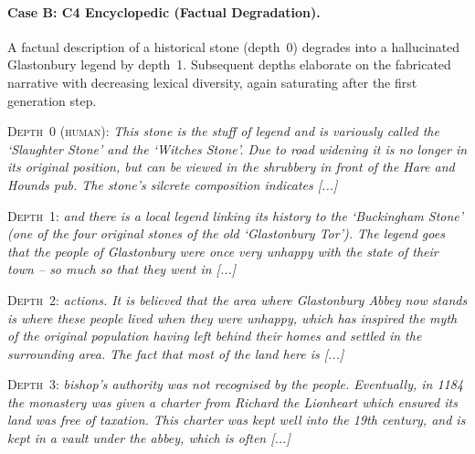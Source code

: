 \medskip

\paragraph{Case B: C4 Encyclopedic (Factual Degradation).}
A factual description of a historical stone (depth~0) degrades into a hallucinated Glastonbury legend by depth~1. Subsequent depths elaborate on the fabricated narrative with decreasing lexical diversity, again saturating after the first generation step.

\begin{center}
{\footnotesize
{}}
\end{center}

\noindent\textsc{Depth~0 (human):} {\small\itshape This stone is the stuff of legend and is variously called the `Slaughter Stone' and the `Witches Stone'. Due to road widening it is no longer in its original position, but can be viewed in the shrubbery in front of the Hare and Hounds pub. The stone's silcrete composition indicates [...]}
\smallskip

\noindent\textsc{Depth~1:} {\small\itshape and there is a local legend linking its history to the `Buckingham Stone' (one of the four original stones of the old `Glastonbury Tor'). The legend goes that the people of Glastonbury were once very unhappy with the state of their town -- so much so that they went in [...]}
\smallskip

\noindent\textsc{Depth~2:} {\small\itshape actions. It is believed that the area where Glastonbury Abbey now stands is where these people lived when they were unhappy, which has inspired the myth of the original population having left behind their homes and settled in the surrounding area. The fact that most of the land here is [...]}
\smallskip

\noindent\textsc{Depth~3:} {\small\itshape bishop's authority was not recognised by the people. Eventually, in 1184 the monastery was given a charter from Richard the Lionheart which ensured its land was free of taxation. This charter was kept well into the 19th century, and is kept in a vault under the abbey, which is often [...]}


